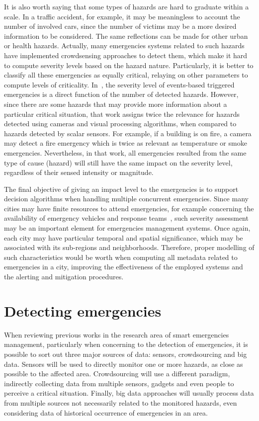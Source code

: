 \begin{refsection}
It is also worth saying that some types of hazards are hard to graduate within a scale. In a traffic accident, for example, it may be meaningless to account the number of involved cars, since the number of victims may be a more desired information to be considered. The same reflections can be made for other urban or health hazards. Actually, many emergencies systems related to such hazards have implemented crowdsensing approaches to detect them, which make it hard to compute severity levels based on the hazard nature. Particularly, it is better to classify all these emergencies as equally critical, relaying on other parameters to compute levels of criticality. In~\cite{emergenciesmetric3}, the severity level of events-based triggered emergencies is a direct function of the number of detected hazards. However, since there are some hazards that may provide more information about a particular critical situation, that work assigns twice the relevance for hazards detected using cameras and visual processing algorithms, when compared to hazards detected by scalar sensors. For example, if a building is on fire, a camera may detect a fire emergency which is twice as relevant as temperature or smoke emergencies. Nevertheless, in that work, all emergencies resulted from the same type of cause (hazard) will still have the same impact on the severity level, regardless of their sensed intensity or magnitude. 

The final objective of giving an impact level to the emergencies is to support decision algorithms when handling multiple concurrent emergencies. Since many cities may have finite resources to attend emergencies, for example concerning the availability of emergency vehicles and response teams~\cite{costa2020automatic,tsunami1}, such severity assessment may be an important element for emergencies management systems. Once again, each city may have particular temporal and spatial significance, which may be associated with its sub-regions and neighborhoods. Therefore, proper modelling of such characteristics would be worth when computing all metadata related to emergencies in a city, improving the effectiveness of the employed systems and the alerting and mitigation procedures.

\section{Detecting emergencies}\label{sec4}

When reviewing previous works in the research area of smart emergencies management, particularly when concerning to the detection of emergencies, it is possible to sort out three major sources of data: sensors, crowdsourcing and big data. Sensors will be used to directly monitor one or more hazards, as close as possible to the affected area. Crowdsourcing will use a different paradigm, indirectly collecting data from multiple sensors, gadgets and even people to perceive a critical situation. Finally, big data approaches will usually process data from multiple sources not necessarily related to the monitored hazards, even considering data of historical occurrence of emergencies in an area. 


\end{refsection}
